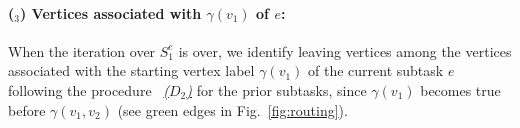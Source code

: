 \documentclass[Afour,sageh,times]{sagej}
\newcounter{mycounter}
\newcommand{\clause}[1]{\mathsf{cls}(#1)}
\newcommand{\ag}[2]{\langle#1,#2\rangle}
\renewcommand{\ap}[3]{\mathcal{\pi}_{{#1},{#2}}^{#3}}
\begin{document}

\paragraph{($_3$) Vertices associated with $\gamma(v_1)$ of $e$:}\label{sec:c} When the iteration over $S_1^e$ is over, we identify leaving vertices  among the vertices associated with the starting vertex label  $\gamma(v_1)$ of the current subtask $e$ following the  procedure ~\hyperref[sec:b]{\it ($D_2$)} for the prior subtasks, since $\gamma(v_1)$  becomes true before $\gamma(v_1, v_2)$ (see green edges in Fig.~\ref{fig:routing}).
\end{document}
